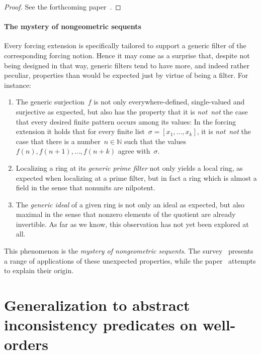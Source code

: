 \documentclass[com,11pt,crcready]{iosart2x}
\theoremstyle{definition}
\theoremstyle{plain}
\theoremstyle{remark}
\newcommand{\?}{\,{:}\,}
\renewcommand{\_}{\mathpunct{.}\,}
\begin{document}
\begin{proof}See the forthcoming
paper~\cite{blechschmidt-oldenziel:multiverse}.\end{proof}


\paragraph{The mystery of nongeometric sequents} Every forcing extension is
specifically tailored to support a generic filter of the corresponding forcing
notion. Hence it may come as a surprise that, despite not being designed in that way,
generic filters tend to have more, and indeed rather peculiar, properties
than would be expected just by virtue of being a filter. For instance:
\begin{enumerate}
\item The generic surjection~$f$ is not only everywhere-defined,
single-valued and surjective as expected, but also has the property that it is
\emph{not~not} the case that every desired finite pattern occurs among its
values: In the forcing extension it holds that for every finite list~$\sigma =
[x_1,\ldots,x_k]$, it is \emph{not~not} the case that there is a number~$n \in
\mathbb{N}$ such that the values~$f(n), f(n+1), \ldots, f(n+k)$ agree
with~$\sigma$.

\item Localizing a ring at its \emph{generic prime filter} not only
yields a local ring, as expected when localizing at a prime filter, but in fact
a ring which is almost a field in the sense that nonunits are nilpotent.

\item The \emph{generic ideal} of a given ring is not only an ideal as
expected, but also maximal in the sense that nonzero elements of the quotient
are already invertible. As far as we know, this observation has not yet been
explored at all.
\end{enumerate}

This phenomenon is the \emph{mystery of nongeometric sequents}. The
survey~\cite[Section~3]{blechschmidt:generalized-spaces} presents a range of
applications of these unexpected properties, while the
paper~\cite{blechschmidt:nullstellensatz} attempts to explain their origin.





\section{Generalization to abstract inconsistency predicates on well-orders}
\label{sect:inc-wf}
\end{document}
